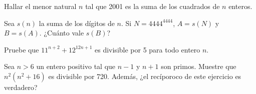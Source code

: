 \begin{exercise}
    Hallar el menor natural $n$ tal que 2001 es la suma de los cuadrados de $n$ enteros.
\end{exercise}

\begin{exercise}
    Sea $s(n)$ la suma de los dígitos de $n$.
    Si $N = 4444^{4444}$, $A = s(N)$ y $B = s(A)$.
    ¿Cuánto vale $s(B)$?
\end{exercise}

\begin{exercise}
    Pruebe que $11^{n + 2} + 12^{12n + 1}$ es divisible por 5 para todo entero $n$.
\end{exercise}

\begin{exercise}
    Sea $n > 6$ un entero positivo tal que $n - 1$ y $n + 1$ son primos.
    Muestre que $n^2 (n^2 + 16)$ es divisible por 720.
    Además, ¿el recíporoco de este ejercicio es verdadero?
\end{exercise}